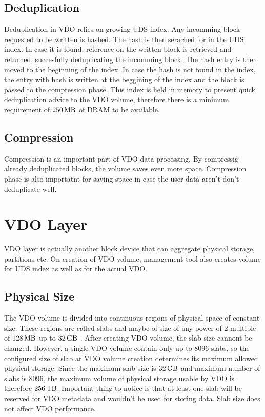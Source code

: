 \documentclass[
  color, %
  table, %
  lof,   %
  lot,   %
]{fithesis3}
\begin{document}
\subsection{Deduplication}
Deduplication in VDO relies on growing UDS index. Any incomming block requested to be written is hashed. The hash is then serached for in the UDS index. In case it is found, reference on the written block is retrieved and returned, succesfully deduplicating the incomming block. The hash entry is then moved to the beginning of the index. In case the hash is not found in the index, the entry with hash is written at the beggining of the index and the block is passed to the compression phase. This index is held in memory to present quick deduplication advice to the VDO volume, therefore there is a minimum requirement of $\SI{250}{\mega\byte}$ of DRAM to be available.

\subsection{Compression}
Compression  is an important part of VDO data processing. By compressig already deduplicated blocks, the volume saves even more space. Compression phase is also importatnt for saving space in case the user data aren't don't deduplicate well.

\section{VDO Layer}
VDO layer is actually another block device that can aggregate physical storage, partitions etc. On creation of VDO volume, management tool also creates volume for UDS index as well as for the actual VDO. 

\subsection{Physical Size}
The VDO volume is divided into continuous regions of physical space of constant size. These regions are called slabs and maybe of size of any power of 2 multiple of $\SI{128}{\mega\byte}$  up to $\SI{32}{\giga\byte}$ . After creating VDO volume, the slab size cannont be changed. However, a single VDO volume contain only up to 8096 slabs, so the configured size of slab at VDO volume creation determines its maximum allowed physical storage. Since the maximum slab size is $\SI{32}{\giga\byte}$ and maximum number of slabs is 8096, the maximum volume of physical storage usable by VDO is therefore $\SI{256}{\tera\byte}$. Important thing to notice is that at least one slab will be reserved for VDO metadata and wouldn't be used for storing data. Slab size does not affect VDO performance.
\end{document}
